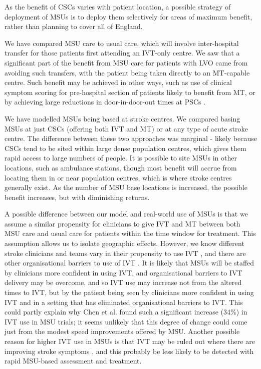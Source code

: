 As the benefit of CSCs varies with patient location, a possible strategy of deployment of MSUs is to deploy them selectively for areas of maximum benefit, rather than planning to cover all of England.

We have compared MSU care to usual care, which will involve inter-hospital transfer for those patients first attending an IVT-only centre. We saw that a significant part of the benefit from MSU care for patients with LVO came from avoiding such transfers, with the patient being taken directly to an MT-capable centre. Such benefit may be achieved in other ways, such as use of clinical symptom scoring for pre-hospital section of patients likely to benefit from MT, or by achieving large reductions in door-in-door-out times at PSCs \cite{perez_de_la_ossa_effect_2022}.

We have modelled MSUs being based at stroke centres. We compared basing MSUs at just CSCs (offering both IVT and MT) or at any type of acute stroke centre. The difference between these two approaches was marginal - likely because CSCs tend to be sited within large dense population centres, which gives them rapid access to large numbers of people. It is possible to site MSUs in other locations, such as ambulance stations, though most benefit will accrue from locating them in or near population centres, which is where stroke centres generally exist. As the number of MSU base locations is increased, the possible benefit increases, but with diminishing returns. 

A possible difference between our model and real-world use of MSUs is that we assume a similar propensity for clinicians to give IVT and MT between both MSU care and usual care for patients within the time window for treatment. This assumption allows us to isolate geographic effects. However, we know different stroke clinicians and teams vary in their propensity to use IVT \cite{de_brun_factors_2018, pearn_what_2023}, and there are other organisational barriers to use of IVT \cite{meurer_provider_2011}. It is likely that MSUs will be staffed by clinicians more confident in using IVT, and organisational barriers to IVT delivery may be overcome, and so IVT use may increase not from the altered times to IVT, but by the patient being seen by clinicians more confident in using IVT and in a setting that has eliminated organisational barriers to IVT. This could partly explain why Chen et al. \cite{chen_systematic_2022} found such a significant increase (34\%) in IVT use in MSU trials; it seems unlikely that this degree of change could come just from the modest speed improvements offered by MSU. Another possible reason for higher IVT use in MSUs is that IVT may be ruled out where there are improving stroke symptoms \cite{balucani_mild_2011}, and this probably be less likely to be detected with rapid MSU-based assessment and treatment.

